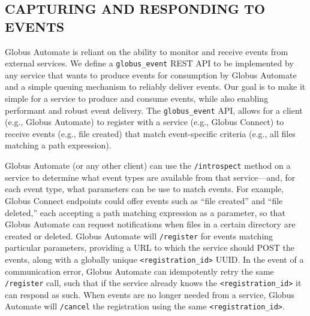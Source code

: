 \documentclass{aip-cp}
\newcommand\code[1]{{\tt \footnotesize #1}}
\newcommand\bluecode[1]{\code{#1}}
\newcommand\darkcode[1]{\code{#1}}
\begin{document}
\subsection{CAPTURING AND RESPONDING TO EVENTS}
Globus Automate is reliant on the ability to monitor and receive events from
external services. 
We define a \darkcode{globus\_event} REST API to be implemented by any service that wants to produce 
events for consumption by Globus Automate
and a simple queuing mechanism to reliably deliver events.
Our goal is to make it simple for a service to produce and consume events, 
while also enabling performant and robust event delivery.
The \darkcode{globus\_event}  API, 
allows for a client (e.g., Globus Automate) to register with a service (e.g., Globus Connect) 
to receive events (e.g., file created) that match event-specific criteria (e.g., all files matching 
a path expression). 


Globus Automate (or any other client)
can use the \darkcode{/introspect} method on a service 
to determine what event types are available from that service---and,
for each event type, what parameters can be use to match events. 
For example, Globus Connect endpoints could offer
events such as ``file created'' and ``file deleted,'' 
each accepting a path matching expression as a parameter,
so that Globus Automate can request notifications when 
files in a certain directory are created or deleted.
Globus Automate will \darkcode{/register} 
for events matching particular parameters, providing a URL to which the service should POST the 
events, along with a globally unique \bluecode{<registration\_id>} UUID.  In the event of a 
communication error, Globus Automate can idempotently retry the same \darkcode{/register} call, such 
that if the service already knows the \bluecode{<registration\_id>} it can respond as such.
When events are no longer needed from a service, Globus Automate will \darkcode{/cancel} the 
registration 
using the same \bluecode{<registration\_id>}.
\end{document}
